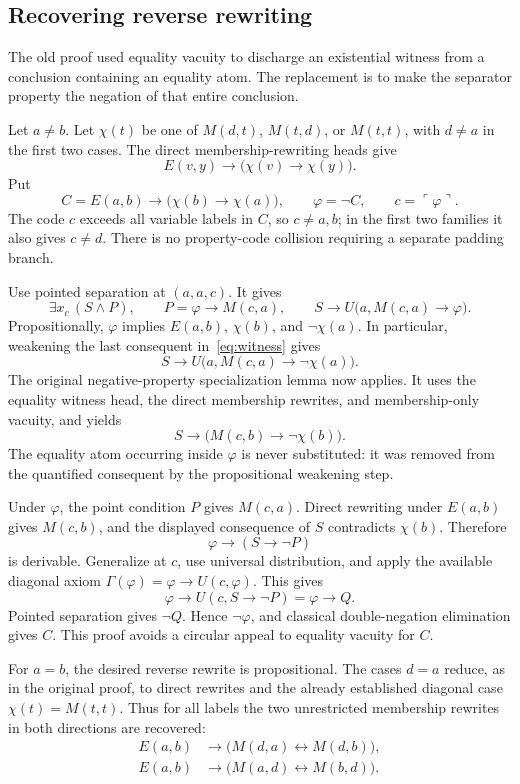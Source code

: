 \subsection{Recovering reverse rewriting}
The old proof used equality vacuity to discharge an existential witness from a conclusion containing an equality atom. The replacement is to make the separator property the negation of that entire conclusion.

Let \(a\ne b\). Let \(\chi(t)\) be one of
\(M(d,t)\), \(M(t,d)\), or \(M(t,t)\), with \(d\ne a\) in the first two cases. The direct membership-rewriting heads give
\[
 E(v,y)\to\bigl(\chi(v)\to\chi(y)\bigr).
\]
Put
\[
 C=E(a,b)\to\bigl(\chi(b)\to\chi(a)\bigr),
 \qquad \varphi=\neg C,\qquad c=\ulcorner\varphi\urcorner.
\]
The code \(c\) exceeds all variable labels in \(C\), so \(c\ne a,b\); in the first two families it also gives \(c\ne d\). There is no property-code collision requiring a separate padding branch.

Use pointed separation at \((a,a,c)\). It gives
\begin{equation}\label{eq:witness}
 \exists x_c\,(S\wedge P),\qquad
 P=\varphi\to M(c,a),\qquad
 S\to U\bigl(a,M(c,a)\to\varphi\bigr).
\end{equation}
Propositionally, \(\varphi\) implies \(E(a,b)\), \(\chi(b)\), and \(\neg\chi(a)\). In particular, weakening the last consequent in~\eqref{eq:witness} gives
\[
 S\to U\bigl(a,M(c,a)\to\neg\chi(a)\bigr).
\]
The original negative-property specialization lemma now applies. It uses the equality witness head, the direct membership rewrites, and membership-only vacuity, and yields
\[
 S\to\bigl(M(c,b)\to\neg\chi(b)\bigr).
\]
The equality atom occurring inside \(\varphi\) is never substituted: it was removed from the quantified consequent by the propositional weakening step.

Under \(\varphi\), the point condition \(P\) gives \(M(c,a)\). Direct rewriting under \(E(a,b)\) gives \(M(c,b)\), and the displayed consequence of \(S\) contradicts \(\chi(b)\). Therefore
\[
 \varphi\to(S\to\neg P)
\]
is derivable. Generalize at \(c\), use universal distribution, and apply the available diagonal axiom
\(\Gamma(\varphi)=\varphi\to U(c,\varphi)\). This gives
\[
 \varphi\to U(c,S\to\neg P)=\varphi\to Q.
\]
Pointed separation gives \(\neg Q\). Hence \(\neg\varphi\), and classical double-negation elimination gives \(C\). This proof avoids a circular appeal to equality vacuity for \(C\).

For \(a=b\), the desired reverse rewrite is propositional. The cases \(d=a\) reduce, as in the original proof, to direct rewrites and the already established diagonal case \(\chi(t)=M(t,t)\). Thus for all labels the two unrestricted membership rewrites in both directions are recovered:
\begin{equation}\label{eq:R-interface}
 \begin{split}
 E(a,b)&\to\bigl(M(d,a)\leftrightarrow M(d,b)\bigr),\\
 E(a,b)&\to\bigl(M(a,d)\leftrightarrow M(b,d)\bigr).
 \end{split}
\end{equation}

